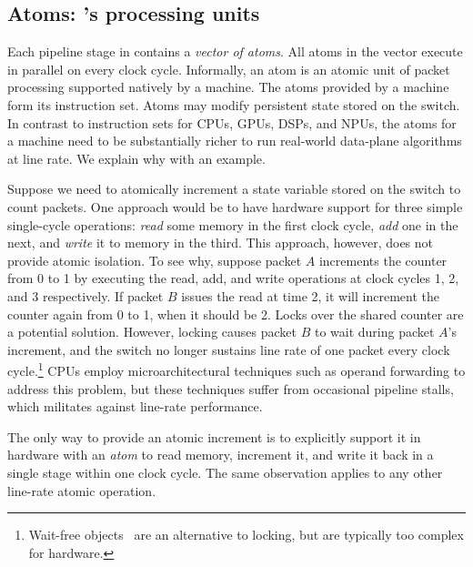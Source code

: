 \subsection{Atoms: \absmachine's processing units}
\label{ss:atoms}

Each pipeline stage in \absmachine contains a {\em vector of
  atoms}. All atoms in the vector execute in parallel on every clock
cycle.  Informally, an atom is an atomic unit of packet processing
supported natively by a \absmachine machine.
The atoms provided by 
a \absmachine machine form its instruction set.
Atoms may modify persistent state stored on the
switch. In contrast to instruction sets for CPUs, GPUs, DSPs, and
NPUs, the atoms for a \absmachine machine need to be substantially
richer to run real-world data-plane algorithms at line rate. We
explain why with an example.

Suppose we need to atomically increment a state variable stored on the switch
to count packets. One approach would be to have hardware support for three
simple single-cycle operations: \textit{read} some memory in the first clock
cycle, \textit{add} one in the next, and \textit{write} it to memory in the
third. This approach, however, does not provide atomic isolation. To see why,
suppose packet $A$ increments the counter from 0 to 1 by executing the read,
add, and write operations at clock cycles 1, 2, and 3 respectively.  If packet
$B$ issues the read at time 2, it will increment the counter again from 0 to 1,
when it should be 2. Locks over the shared counter are a potential
solution. However, locking causes packet $B$ to wait during packet $A$'s
increment, and the switch no longer sustains line rate of one packet every
clock cycle.\footnote{Wait-free objects~\cite{herlihy_wait} are an alternative
  to locking, but are typically too complex for hardware.} CPUs employ microarchitectural
  techniques such as operand forwarding to address this problem, but these techniques
  suffer from occasional pipeline stalls, which militates against line-rate
  performance.

The only way to provide an atomic increment is to explicitly support it in
hardware with an {\em atom} to read memory, increment it, and write it back in
a single stage within one clock cycle. The same observation applies to any
other line-rate atomic operation.

